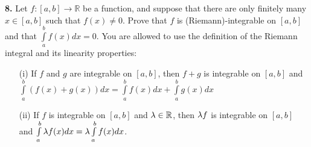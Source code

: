 \documentclass[11pt]{amsart}
\begin{document}
\skv
{\bf 8.} Let $f:[a,b]\to\mathbb R$ be a function, and suppose that there are only finitely many $x\in [a,b]$ such that $f(x)\neq 0$. Prove that
$f$ is (Riemann)-integrable on $[a,b]$ and that $\int\limits_{a}^b f(x)dx=0$. You are allowed to use the definition of the Riemann integral and its linearity properties:
\begin{itemize}
\item[(i)] If $f$ and $g$ are integrable on $[a,b]$, then $f+g$ is integrable on $[a,b]$ and 
$\int\limits_{a}^b (f(x)+g(x))dx=\int\limits_{a}^b f(x)dx+\int\limits_{a}^b g(x)dx$

\item[(ii)] If $f$ is integrable on $[a,b]$ and ${\lambda}\in\mathbb R$, then ${\lambda} f$ is integrable on $[a,b]$ and
$\int\limits_{a}^b {\lambda} f(x) dx={\lambda} \int\limits_{a}^b f(x)dx$.
\end{itemize}
\end{document}
